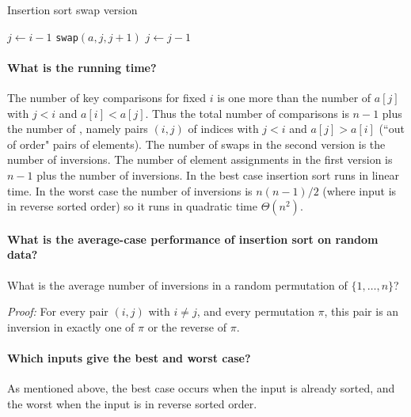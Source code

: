 \begin{algorithm}[H]
  \caption{Insertion sort swap version
    \label{alg:insort2}}
\begin{algorithmic}[1]
\State $j \gets i - 1$
\State {}
\State \texttt{swap}$(a,j,j+1)$
\State $j \gets j - 1$
\EndWhile
\EndFor
\State {}
\EndFunction  
\end{algorithmic}
\end{algorithm}

\paragraph{What is the running time?}
The number of key comparisons for fixed $i$ is one more than the number of $a[j]$ with $j < i$ and $a[i] < a[j]$.
Thus the total number of comparisons is $n-1$ plus the number of , 
namely pairs $(i, j)$ of indices with $j < i$ and $a[j] > a[i]$ (``out of order" pairs of elements).
The number of swaps in the second version is the number of inversions. 
The number of element assignments in the first version is $n-1$ plus the number of inversions.
In the best case insertion sort runs in linear time. 
In the worst case the number of inversions is $n(n-1)/2$ 
(where input is in reverse sorted order) so it runs in quadratic time $\Theta(n^2)$.


\paragraph{What is the average-case performance of insertion sort on random data?}
\begin{Boxample}[4]
What is the average number of inversions in a random permutation of $\{1,\dots, n\}$?
\end{Boxample}
\textit{Proof:} For every pair $(i,j)$ with $i\neq j$,  and every permutation $\pi$, 
this pair is an inversion in exactly one of $\pi$ or the reverse of $\pi$.
\fi

\paragraph{Which inputs give the best and worst case?}
As mentioned above, the best case occurs when the input is already sorted, and the worst when the input is in reverse sorted order.

